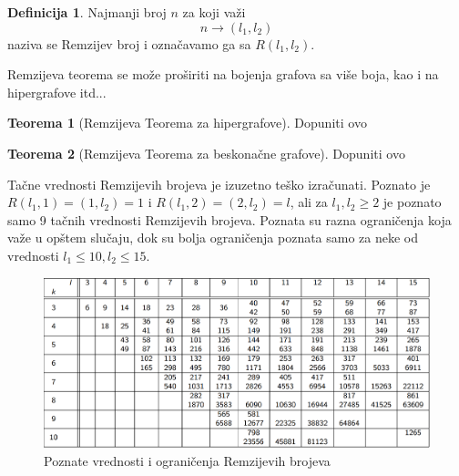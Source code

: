\documentclass{article}
\theoremstyle{definition}
\newtheorem{definicija}{Definicija}[section]
\newtheorem{teorema}{Teorema}[section]
\begin{document}
	\begin{definicija}
		Najmanji broj $n$ za koji važi
		\[
		n\rightarrow(l_1,l_2)
		\]
		naziva se Remzijev broj i označavamo ga sa $R(l_1,l_2)$.
	\end{definicija}
	
	Remzijeva teorema se može proširiti na bojenja grafova sa više boja, kao i na hipergrafove itd...
	
	\begin{teorema}[Remzijeva Teorema za hipergrafove]
		Dopuniti ovo
	\end{teorema}
	
	\begin{teorema}[Remzijeva Teorema za beskonačne grafove]
		Dopuniti ovo
	\end{teorema}

	Tačne vrednosti Remzijevih brojeva je izuzetno teško izračunati. Poznato je $R(l_1,1)= (1,l_2) = 1$ i $R(l_1,2)= (2,l_2) = l$, ali za $l_1,l_2 \geq 2$ je poznato samo 9  tačnih vrednosti Remzijevih brojeva. Poznata su razna ograničenja koja važe u opštem slučaju, dok su bolja ograničenja poznata samo za neke od vrednosti $l_1\leq 10, l_2\leq 15$.
	
	\begin{figure}[h]
		\centering
		\includegraphics[width=\textwidth]{remziTabela}
		\caption{Poznate vrednosti i ograničenja Remzijevih brojeva\label{poznatiBrojevi}}
	\end{figure}
	
	
\end{document}
